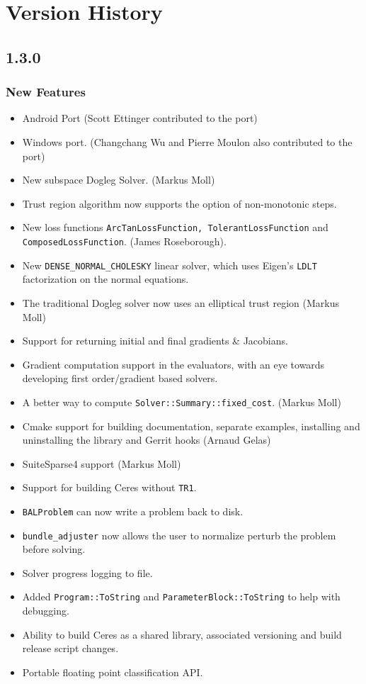 
\chapter{Version History}
\section*{1.3.0}
\subsection{New Features}
\begin{itemize}
\item Android Port (Scott Ettinger contributed to the port)
\item Windows port. (Changchang Wu and Pierre Moulon also contributed to the port)
\item New subspace Dogleg Solver. (Markus Moll)
\item Trust region algorithm now supports the option of non-monotonic steps.
\item New loss functions \texttt{ArcTanLossFunction,
    TolerantLossFunction} and \texttt{ComposedLossFunction}. (James Roseborough).
\item New \texttt{DENSE\_NORMAL\_CHOLESKY} linear solver, which uses Eigen's
  \texttt{LDLT} factorization on the normal equations.
\item The traditional Dogleg solver now uses an elliptical trust
  region (Markus Moll)
\item Support for returning initial and final gradients \& Jacobians.
\item Gradient computation support in the evaluators, with an eye
  towards developing first order/gradient based solvers.
\item A better way to compute \texttt{Solver::Summary::fixed\_cost}. (Markus Moll)
\item Cmake support for building documentation, separate examples,
  installing and uninstalling the library and Gerrit hooks (Arnaud
  Gelas)
\item SuiteSparse4 support (Markus Moll)
\item Support for building Ceres without \texttt{TR1}.
\item \texttt{BALProblem} can now write a problem back to disk.
\item \texttt{bundle\_adjuster} now allows the user to normalize perturb the
  problem before solving.
\item Solver progress logging to file.
\item Added \texttt{Program::ToString} and
  \texttt{ParameterBlock::ToString}  to help with debugging.
\item Ability to build Ceres as a shared library, associated versioning and build release script changes.
\item Portable floating point classification API.
\end{itemize}

